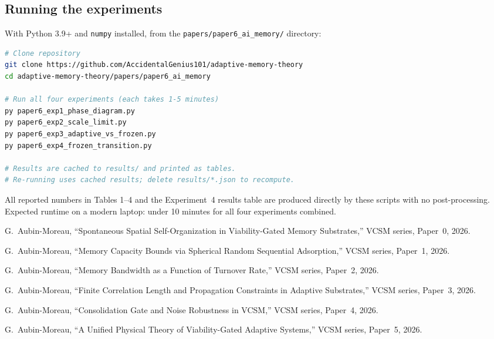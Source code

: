 \documentclass[12pt]{article}
\begin{document}
\subsection*{Running the experiments}

With Python 3.9+ and \texttt{numpy} installed, from the \texttt{papers/paper6\_ai\_memory/} directory:

\begin{lstlisting}[language=bash, caption={Running all Paper 6 experiments.}]
# Clone repository
git clone https://github.com/AccidentalGenius101/adaptive-memory-theory
cd adaptive-memory-theory/papers/paper6_ai_memory

# Run all four experiments (each takes 1-5 minutes)
py paper6_exp1_phase_diagram.py
py paper6_exp2_scale_limit.py
py paper6_exp3_adaptive_vs_frozen.py
py paper6_exp4_frozen_transition.py

# Results are cached to results/ and printed as tables.
# Re-running uses cached results; delete results/*.json to recompute.
\end{lstlisting}

All reported numbers in Tables 1--4 and the Experiment~4 results table are produced directly by these scripts with no post-processing. Expected runtime on a modern laptop: under 10 minutes for all four experiments combined.


\begin{thebibliography}{99}

G.~Aubin-Moreau,
``Spontaneous Spatial Self-Organization in Viability-Gated Memory Substrates,''
VCSM series, Paper~0, 2026.

G.~Aubin-Moreau,
``Memory Capacity Bounds via Spherical Random Sequential Adsorption,''
VCSM series, Paper~1, 2026.

G.~Aubin-Moreau,
``Memory Bandwidth as a Function of Turnover Rate,''
VCSM series, Paper~2, 2026.

G.~Aubin-Moreau,
``Finite Correlation Length and Propagation Constraints in Adaptive Substrates,''
VCSM series, Paper~3, 2026.

G.~Aubin-Moreau,
``Consolidation Gate and Noise Robustness in VCSM,''
VCSM series, Paper~4, 2026.

G.~Aubin-Moreau,
``A Unified Physical Theory of Viability-Gated Adaptive Systems,''
VCSM series, Paper~5, 2026.

\end{thebibliography}
\end{document}
